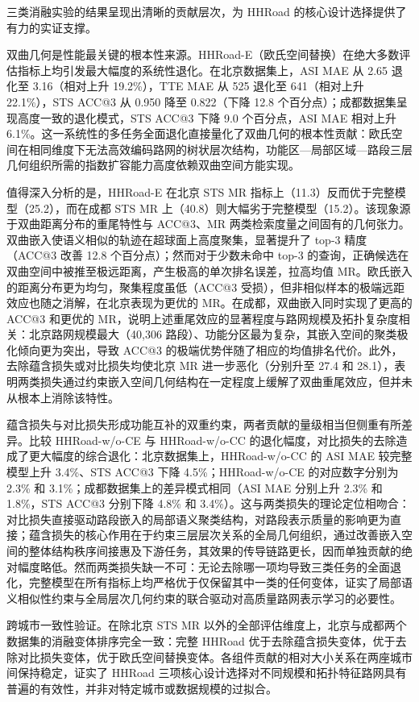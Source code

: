三类消融实验的结果呈现出清晰的贡献层次，为 HHRoad 的核心设计选择提供了有力的实证支撑。

双曲几何是性能最关键的根本性来源。HHRoad-E（欧氏空间替换）在绝大多数评估指标上均引发最大幅度的系统性退化。在北京数据集上，ASI MAE 从 2.65 退化至 3.16（相对上升 19.2\%），TTE MAE 从 525 退化至 641（相对上升 22.1\%），STS ACC@3 从 0.950 降至 0.822（下降 12.8 个百分点）；成都数据集呈现高度一致的退化模式，STS ACC@3 下降 9.0 个百分点，ASI MAE 相对上升 6.1\%。这一系统性的多任务全面退化直接量化了双曲几何的根本性贡献：欧氏空间在相同维度下无法高效编码路网的树状层次结构，功能区—局部区域—路段三层几何组织所需的指数扩容能力高度依赖双曲空间方能实现。

值得深入分析的是，HHRoad-E 在北京 STS MR 指标上（11.3）反而优于完整模型（25.2），而在成都 STS MR 上（40.8）则大幅劣于完整模型（15.2）。该现象源于双曲距离分布的重尾特性与 ACC@3、MR 两类检索度量之间固有的几何张力。双曲嵌入使语义相似的轨迹在超球面上高度聚集，显著提升了 top-3 精度（ACC@3 改善 12.8 个百分点）；然而对于少数未命中 top-3 的查询，正确候选在双曲空间中被推至极远距离，产生极高的单次排名误差，拉高均值 MR。欧氏嵌入的距离分布更为均匀，聚集程度虽低（ACC@3 受损），但非相似样本的极端远距效应也随之消解，在北京表现为更优的 MR。在成都，双曲嵌入同时实现了更高的 ACC@3 和更优的 MR，说明上述重尾效应的显著程度与路网规模及拓扑复杂度相关：北京路网规模最大（40,306 路段）、功能分区最为复杂，其嵌入空间的聚类极化倾向更为突出，导致 ACC@3 的极端优势伴随了相应的均值排名代价。此外，去除蕴含损失或对比损失均使北京 MR 进一步恶化（分别升至 27.4 和 28.1），表明两类损失通过约束嵌入空间几何结构在一定程度上缓解了双曲重尾效应，但并未从根本上消除该特性。

蕴含损失与对比损失形成功能互补的双重约束，两者贡献的量级相当但侧重有所差异。比较 HHRoad-w/o-CE 与 HHRoad-w/o-CC 的退化幅度，对比损失的去除造成了更大幅度的综合退化：北京数据集上，HHRoad-w/o-CC 的 ASI MAE 较完整模型上升 3.4\%、STS ACC@3 下降 4.5\%；HHRoad-w/o-CE 的对应数字分别为 2.3\% 和 3.1\%；成都数据集上的差异模式相同（ASI MAE 分别上升 2.3\% 和 1.8\%，STS ACC@3 分别下降 4.8\% 和 3.4\%）。这与两类损失的理论定位相吻合：对比损失直接驱动路段嵌入的局部语义聚类结构，对路段表示质量的影响更为直接；蕴含损失的核心作用在于约束三层层次关系的全局几何组织，通过改善嵌入空间的整体结构秩序间接惠及下游任务，其效果的传导链路更长，因而单独贡献的绝对幅度略低。然而两类损失缺一不可：无论去除哪一项均导致三类任务的全面退化，完整模型在所有指标上均严格优于仅保留其中一类的任何变体，证实了局部语义相似性约束与全局层次几何约束的联合驱动对高质量路网表示学习的必要性。

跨城市一致性验证。在除北京 STS MR 以外的全部评估维度上，北京与成都两个数据集的消融变体排序完全一致：完整 HHRoad 优于去除蕴含损失变体，优于去除对比损失变体，优于欧氏空间替换变体。各组件贡献的相对大小关系在两座城市间保持稳定，证实了 HHRoad 三项核心设计选择对不同规模和拓扑特征路网具有普遍的有效性，并非对特定城市或数据规模的过拟合。

